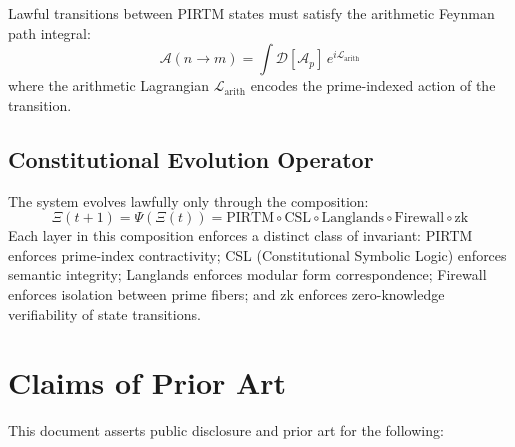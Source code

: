 \documentclass[12pt,letterpaper]{article}
\theoremstyle{definition}
\theoremstyle{remark}
\begin{document}
Lawful transitions between PIRTM states must satisfy the arithmetic Feynman path integral:
\begin{equation}
\mathcal{A}(n \to m) = \int \mathcal{D}[\mathcal{A}_p]\, e^{i\mathcal{L}_{\mathrm{arith}}}
\end{equation}
where the arithmetic Lagrangian $\mathcal{L}_{\mathrm{arith}}$ encodes the prime-indexed action of the transition.

\subsection{Constitutional Evolution Operator}

The system evolves lawfully only through the composition:
\begin{equation}
\Xi(t+1) = \Psi(\Xi(t)) = \text{PIRTM} \circ \text{CSL} \circ \text{Langlands} \circ \text{Firewall} \circ \text{zk}
\end{equation}
Each layer in this composition enforces a distinct class of invariant: PIRTM enforces prime-index contractivity; CSL (Constitutional Symbolic Logic) enforces semantic integrity; Langlands enforces modular form correspondence; Firewall enforces isolation between prime fibers; and zk enforces zero-knowledge verifiability of state transitions.

\section{Claims of Prior Art}

This document asserts public disclosure and prior art for the following:
\end{document}
